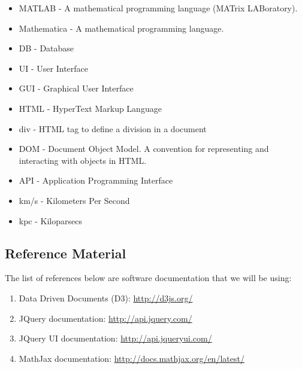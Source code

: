 \documentclass[titlepage]{article}
\begin{document}
\begin{itemize}
\begin{itemize}
		\item MATLAB - A mathematical programming language (MATrix LABoratory).
		\item Mathematica - A mathematical programming language.
		\item DB - Database
        \item UI - User Interface
		\item GUI - Graphical User Interface
		\item HTML - HyperText Markup Language
		\item div - HTML tag to define a division in a document
        \item DOM - Document Object Model. A convention for representing and interacting with objects in HTML.
        \item API - Application Programming Interface
        \item km/s - Kilometers Per Second
        \item kpc - Kiloparsecs
	\end{itemize}
\end{itemize}

\subsection{Reference Material}
The list of references below are software documentation that we will be using:
\begin{enumerate}
	\item Data Driven Documents (D3): \href{http://d3js.org/}{\color{blue} http://d3js.org/}
	\item JQuery documentation: \href{http://api.jquery.com/}{\color{blue} http://api.jquery.com/}
	\item JQuery UI documentation: \href{http://api.jqueryui.com/}{\color{blue} http://api.jqueryui.com/}
	\item MathJax documentation: \href{http://docs.mathjax.org/en/latest/}{\color{blue} http://docs.mathjax.org/en/latest/}
\end{enumerate}
\end{document}
